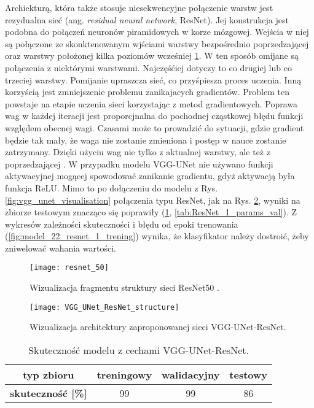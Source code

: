 {\parindent0pt
Archiekturą, która także stosuje niesekwencyjne połączenie warstw jest rezydualna sieć (ang. \textit{residual neural network}, ResNet). Jej konstrukcja jest podobna do połączeń neuronów piramidowych w korze mózgowej. Wejścia w niej są połączone ze skonktenowanym wjściami warstwy bezpośrednio poprzedzającej oraz warstwy położonej kilka poziomów wcześniej \ref{fig:resnet_50}. W ten sposób omijane są połączenia z niektórymi warstwami. Najczęśćiej dotyczy to co drugiej lub co trzeciej warstwy. Pomijanie upraszcza sieć, co przyśpiesza proces uczenia. Inną korzyścią jest zmniejszenie problemu zanikajacych gradientów. Problem ten powstaje na etapie uczenia sieci korzystając z metod gradientowych. Poprawa wag w każdej iteracji jest proporcjnalna do pochodnej cząstkowej błędu funkcji względem obecnej wagi. Czasami może to prowadzić do sytuacji, gdzie gradient będzie tak mały, że waga nie zostanie zmieniona i postęp w nauce zostanie zatrzymany. Dzięki użyciu wag nie tylko z aktualnej warstwy, ale też z poprzedzającej \cite{vanishing_gradinets}. W przypadku modelu VGG-UNet nie używano funkcji aktywacyjnej mogącej spowodować zanikanie gradientu, gdyż aktywacją była funkcja ReLU. Mimo to po dołączeniu do modelu z Rys. \ref{fig:vgg_unet_visualisation}  połączenia typu ResNet, jak na Rys. \ref{fig:VGG_UNet_ResNet_structure}, wyniki na zbiorze testowym znacząco się poprawiły (\ref{tab:ResNet_1_acc}, \ref{tab:ResNet_1_params_val}). Z wykresów zależności skuteczności i błędu od epoki trenowania (\ref{fig:model_22_resnet_1_trening}) wynika, że klasyfikator należy dostroić, żeby zniwelować wahania wartości.

\begin{figure}[h!]
	\centering
	\centering
		\texttt{[image: resnet\_50]}	
	\caption{Wizualizacja fragmentu struktury sieci ResNet50 \cite{Res_Net_architecture}.}	\label{fig:resnet_50}
\end{figure}

\begin{figure}[h!]
	\centering
	\centering
		\texttt{[image: VGG\_UNet\_ResNet\_structure]}	
	\caption{Wizualizacja architektury zaproponowanej sieci VGG-UNet-ResNet.}	\label{fig:VGG_UNet_ResNet_structure}
\end{figure}

\begin{table}[h!]
\centering
\caption[Short Heading]{Skuteczność modelu z cechami VGG-UNet-ResNet.}
\label{tab:ResNet_1_acc}
\begin{tabular}{|c|c|c|c|}
\hline
\textbf{typ zbioru}           & \textbf{treningowy} & \textbf{walidacyjny} & \textbf{testowy} \\ \hline
\textbf{skuteczność {[}\%{]}} & 99                  & 99                   & 86               \\ \hline
\end{tabular}
\end{table}

}

